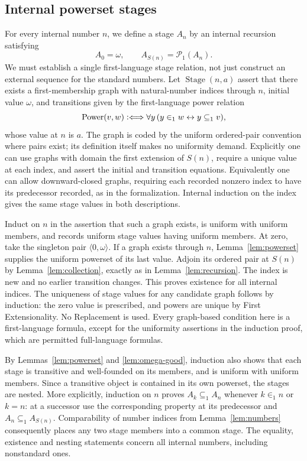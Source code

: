 \documentclass[11pt,a4paper]{article}
\numberwithin{equation}{section}
\theoremstyle{definition}
\theoremstyle{remark}
\newcommand{\Pow}{\mathcal P_1}
\newcommand{\subone}{\subseteq_1}
\newcommand{\extone}{\in_1}
\newcommand{\defiff}{\mathrel{\vcentcolon\Longleftrightarrow}}
\begin{document}
\subsection{Internal powerset stages}
For every internal number $n$, we define a stage $A_n$ by an internal recursion satisfying
\begin{equation}\label{eq:stages}
 A_0=\omega,\qquad A_{S(n)}=\Pow(A_n).
\end{equation}
We must establish a single first-language stage relation, not just construct an external sequence for the standard numbers. Let $\operatorname{Stage}(n,a)$ assert that there exists a first-membership graph with natural-number indices through $n$, initial value $\omega$, and transitions given by the first-language power relation
\[\operatorname{Power}(v,w)\defiff \forall y\,(y\extone w\leftrightarrow y\subone v),\]
whose value at $n$ is $a$. The graph is coded by the uniform ordered-pair convention where pairs exist; its definition itself makes no uniformity demand. Explicitly one can use graphs with domain the first extension of $S(n)$, require a unique value at each index, and assert the initial and transition equations. Equivalently one can allow downward-closed graphs, requiring each recorded nonzero index to have its predecessor recorded, as in the formalization. Internal induction on the index gives the same stage values in both descriptions.

Induct on $n$ in the assertion that such a graph exists, is uniform with uniform members, and records uniform stage values having uniform members. At zero, take the singleton pair $\langle 0,\omega\rangle$. If a graph exists through $n$, Lemma~\ref{lem:powerset} supplies the uniform powerset of its last value. Adjoin its ordered pair at $S(n)$ by Lemma~\ref{lem:collection}, exactly as in Lemma~\ref{lem:recursion}. The index is new and no earlier transition changes. This proves existence for all internal indices. The uniqueness of stage values for any candidate graph follows by induction: the zero value is prescribed, and powers are unique by First Extensionality. No Replacement is used. Every graph-based condition here is a first-language formula, except for the uniformity assertions in the induction proof, which are permitted full-language formulas.

By Lemmas~\ref{lem:powerset} and \ref{lem:omega-good}, induction also shows that each stage is transitive and well-founded on its members, and is uniform with uniform members. Since a transitive object is contained in its own powerset, the stages are nested. More explicitly, induction on $n$ proves $A_k\subone A_n$ whenever $k\extone n$ or $k=n$: at a successor use the corresponding property at its predecessor and $A_n\subone A_{S(n)}$. Comparability of number indices from Lemma~\ref{lem:numbers} consequently places any two stage members into a common stage. The equality, existence and nesting statements concern all internal numbers, including nonstandard ones.
\end{document}

